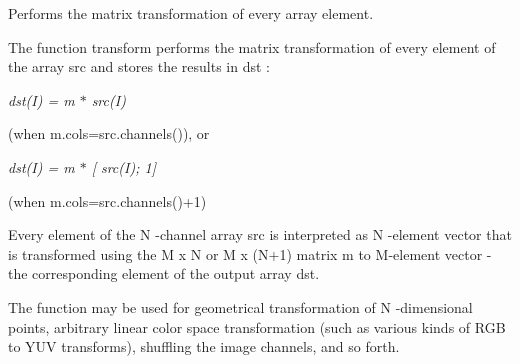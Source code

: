 Performs the matrix transformation of every array element.

The function {\ttfamily transform} performs the matrix transformation of every element of the array {\ttfamily src} and stores the results in {\ttfamily dst} \+:

{\itshape dst(\+I) = m $\ast$ src(\+I)}

(when {\ttfamily m.\+cols=src.\+channels()}), or

{\itshape dst(\+I) = m $\ast$ \mbox{[} src(\+I); 1\mbox{]}}

(when {\ttfamily m.\+cols=src.\+channels()+1})

Every element of the {\ttfamily N} -\/channel array {\ttfamily src} is interpreted as {\ttfamily N} -\/element vector that is transformed using the {\ttfamily M x N} or {\ttfamily M x (N+1)} matrix {\ttfamily m} to {\ttfamily M}-\/element vector -\/ the corresponding element of the output array {\ttfamily dst}.

The function may be used for geometrical transformation of {\ttfamily N} -\/dimensional points, arbitrary linear color space transformation (such as various kinds of R\+GB to Y\+UV transforms), shuffling the image channels, and so forth.


